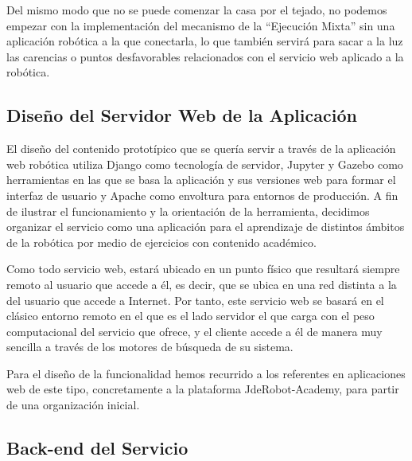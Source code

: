 Del mismo modo que no se puede comenzar la casa por el tejado, no podemos empezar con la implementación del mecanismo de la ``Ejecución Mixta'' sin una aplicación robótica a la que conectarla, lo que también servirá para sacar a la luz las carencias o puntos desfavorables relacionados con el servicio web aplicado a la robótica.

\subsection{Diseño del Servidor Web de la Aplicación}

El diseño del contenido prototípico que se quería servir a través de la aplicación web robótica utiliza Django como tecnología de servidor, Jupyter y Gazebo como herramientas en las que se basa la aplicación y sus versiones web para formar el interfaz de usuario y Apache como envoltura para entornos de producción. A fin de ilustrar el funcionamiento y la orientación de la herramienta, decidimos organizar el servicio como una aplicación para el aprendizaje de distintos ámbitos de la robótica por medio de ejercicios con contenido académico.

Como todo servicio web, estará ubicado en un punto físico que resultará siempre remoto al usuario que accede a él, es decir, que se ubica en una red distinta a la del usuario que accede a Internet. Por tanto, este servicio web se basará en el clásico entorno remoto en el que es el lado servidor el que carga con el peso computacional del servicio que ofrece, y el cliente accede a él de manera muy sencilla a través de los motores de búsqueda de su sistema.

Para el diseño de la funcionalidad hemos recurrido a los referentes en aplicaciones web de este tipo, concretamente a la plataforma JdeRobot-Academy, para partir de una organización inicial.

\subsection{Back-end del Servicio}

